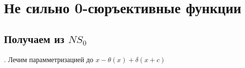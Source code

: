 \documentclass[main.tex]{subfiles}
\begin{document}
\section{Не сильно 0-сюръективные функции}
\subsection{Получаем из $NS_0$}.
Лечим парамметризацией до $x-\theta(x) + \delta(x+c)$
\end{document}
